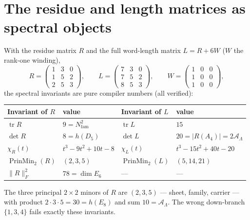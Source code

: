 \documentclass[11pt,a4paper]{article}
\newcommand{\Nfam}{N_{\mathrm{fam}}}
\newcommand{\AL}{\mathcal A_\Lambda}
\theoremstyle{definition}
\renewcommand{\arraystretch}{1.15}
\begin{document}
\section{The residue and length matrices as spectral objects}
With the residue matrix $R$ and the full word-length matrix $L=R+6W$ ($W$ the rank-one winding),
\[
  R=\begin{pmatrix}1&3&0\\1&5&2\\2&5&3\end{pmatrix},\qquad
  L=\begin{pmatrix}7&3&0\\7&5&2\\8&5&3\end{pmatrix},\qquad
  W=\begin{pmatrix}1&0&0\\1&0&0\\1&0&0\end{pmatrix},
\]
the spectral invariants are pure compiler numbers (all verified):
\begin{center}\small
\renewcommand{\arraystretch}{1.25}
\begin{tabularx}{\linewidth}{@{}lYlY@{}}
\toprule
\textbf{Invariant of $R$} & \textbf{value} & \textbf{Invariant of $L$} & \textbf{value} \\
\midrule
$\operatorname{tr}R$ & $9=\Nfam^2$ & $\operatorname{tr}L$ & $15$ \\
$\det R$ & $8=h(D_5)$ & $\det L$ & $20=|R(A_4)|=2\AL$ \\
$\chi_R(t)$ & $t^3-9t^2+10t-8$ & $\chi_L(t)$ & $t^3-15t^2+40t-20$ \\
$\operatorname{PrinMin}_2(R)$ & $(2,3,5)$ & $\operatorname{PrinMin}_2(L)$ & $(5,14,21)$ \\
$\|R\|_F^2$ & $78=\dim E_6$ & --- & --- \\
\bottomrule
\end{tabularx}
\end{center}

\noindent The three principal $2{\times}2$ minors of $R$ are $(2,3,5)$ --- sheet, family, carrier ---
with product $2\cdot3\cdot5=30=h(E_8)$ and sum $10=\AL$. The wrong down-branch $\{1,3,4\}$ fails exactly
these invariants.
\end{document}
